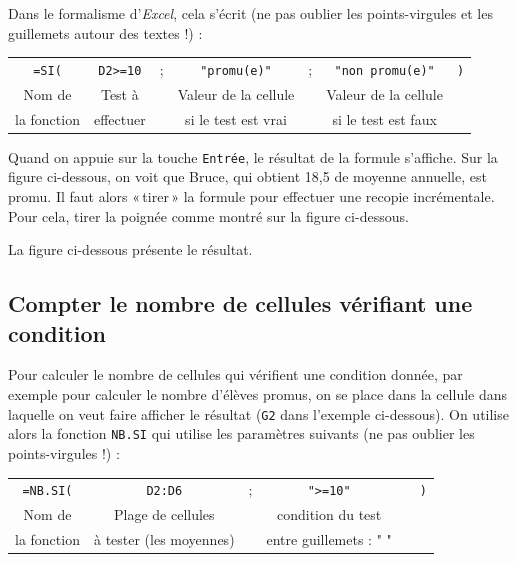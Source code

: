 Dans le formalisme d'\emph{Excel}, cela s'écrit (ne pas oublier les points-virgules et les guillemets autour des textes !) :

\begin{center}
	\begin{tabular}{ccccccc}
		\texttt{=SI(} & \texttt{D2>=10} & ; & \texttt{"promu(e)"} & ; & \texttt{"non promu(e)"} & \texttt{)} \\ 
		Nom de & Test à  & & Valeur de la cellule & & Valeur de la cellule & \\
		la fonction & effectuer & &  si le test est vrai & & si le test est faux & \\  
	\end{tabular}
\end{center}


Quand on appuie sur la touche \texttt{Entrée}, le résultat de la formule s'affiche. Sur la figure ci-dessous, on voit que Bruce, qui obtient 18,5 de moyenne annuelle, est promu. Il faut alors «\,tirer\,» la formule pour effectuer une recopie incrémentale. Pour cela, tirer la poignée comme montré sur la figure ci-dessous.


La figure ci-dessous présente le résultat.


\subsection{Compter le nombre de cellules vérifiant une condition}\label{Calc3NBSI}

Pour calculer le nombre de cellules qui vérifient une condition donnée, par exemple pour calculer le nombre d'élèves promus, on se place dans la cellule dans laquelle on veut faire afficher le résultat (\texttt{G2} dans l'exemple ci-dessous). On utilise alors la fonction \texttt{NB.SI} qui utilise les paramètres suivants (ne pas oublier les points-virgules !) :


\begin{center}
	\begin{tabular}{cccccc}
		\texttt{=NB.SI(} & \texttt{D2:D6} & ; & \texttt{">=10"} &  &  \texttt{)} \\  
		Nom de & Plage de cellules  & & condition du test &  & \\
		la fonction & à tester (les moyennes) & &  entre guillemets : " " & & \\  
	\end{tabular}
\end{center}

